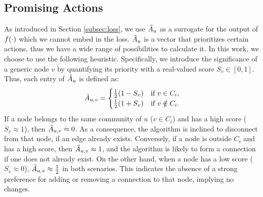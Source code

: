 

\subsection{Promising Actions}
\label{subsec:candlist}
As introduced in Section \ref{subsec:loss}, we use $\tilde{A}_{u}$ as a surrogate for the output of $f(\cdot)$ which we cannot embed in the loss. $\tilde{A}_{u}$ is a vector that prioritizes certain actions, thus we have a wide range of possibilities to calculate it. In this work, we choose to use the following heuristic.
Specifically, we introduce the significance of a generic node $v$ by quantifying its priority with a real-valued score $S_v \in [0,1]$. Thus, each entry of $\tilde{A}_{u}$ is defined as:
\begin{equation}
\label{eq:candlist}
        \tilde{A}_{u,v} = 
        \begin{cases}
            \frac{1}{2}(1-S_v) & \text{if } v \in C_i,  \\
            \frac{1}{2}(1+S_v) & \text{if } v \notin C_i.    
        \end{cases}
\end{equation} 
If a node belongs to the same community of $u$ ($v \in C_i$) and has a high score ($S_v \approx 1$), then $\tilde{A}_{u,v} \approx 0$. As a consequence, the algorithm is inclined to disconnect from that node, if an edge already exists. Conversely, if a node is outside $C_i$ and has a high score, then $\tilde{A}_{u,v} \approx 1$, and the algorithm is likely to form a connection if one does not already exist. On the other hand, when a node has a low score ($S_v \approx 0$), $\tilde{A}_{u,v} \approx \frac{1}{2}$ in both scenarios. This indicates the absence of a strong preference for adding or removing a connection to that node, implying no changes.


